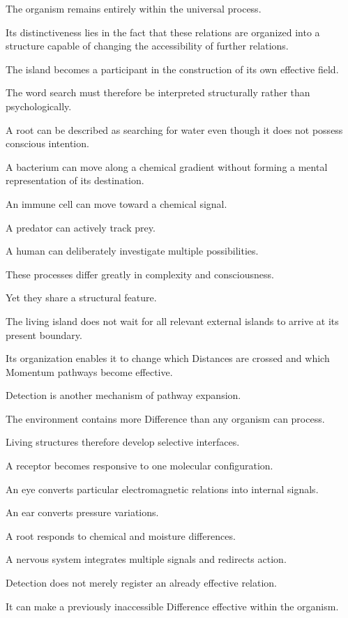 The organism remains entirely within the universal process.

Its distinctiveness lies in the fact that these relations are organized into a structure capable of changing the accessibility of further relations.

The island becomes a participant in the construction of its own effective field.

The word search must therefore be interpreted structurally rather than psychologically.

A root can be described as searching for water even though it does not possess conscious intention.

A bacterium can move along a chemical gradient without forming a mental representation of its destination.

An immune cell can move toward a chemical signal.

A predator can actively track prey.

A human can deliberately investigate multiple possibilities.

These processes differ greatly in complexity and consciousness.

Yet they share a structural feature.

The living island does not wait for all relevant external islands to arrive at its present boundary.

Its organization enables it to change which Distances are crossed and which Momentum pathways become effective.

Detection is another mechanism of pathway expansion.

The environment contains more Difference than any organism can process.

Living structures therefore develop selective interfaces.

A receptor becomes responsive to one molecular configuration.

An eye converts particular electromagnetic relations into internal signals.

An ear converts pressure variations.

A root responds to chemical and moisture differences.

A nervous system integrates multiple signals and redirects action.

Detection does not merely register an already effective relation.

It can make a previously inaccessible Difference effective within the organism.

